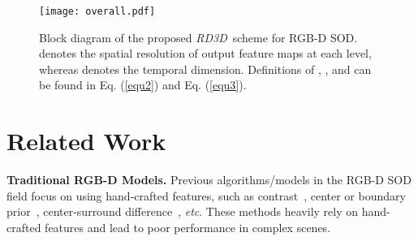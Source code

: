 \documentclass[letterpaper]{article}
\def\etc{\emph{etc}}
\def\ourmodel{\emph{RD3D}}
\begin{document}
\begin{figure*}[!htb]
	\centering
	\texttt{[image: overall.pdf]}\vspace{-0.4cm}
	\caption{\small Block diagram of the proposed \ourmodel~scheme for RGB-D SOD.  denotes the spatial resolution of output feature maps at each level, whereas  denotes the temporal dimension. Definitions of , , and  can be found in Eq. (\ref{equ2}) and Eq. (\ref{equ3}).}\vspace{-0.4cm}
	\label{label1}
\end{figure*}

\section{Related Work}

\noindent \textbf{Traditional RGB-D Models.} Previous algorithms/models in the RGB-D SOD field focus on using hand-crafted features, such as contrast~\cite{cong2016saliency,cheng2014depth,desingh2013depth}, center or boundary prior~\cite{cheng2014depth,cong2019going}, center-surround difference~\cite{ju2014depth,guo2016salient}, \etc. These methods heavily rely on hand-crafted features and lead to poor performance in complex scenes.
\end{document}
